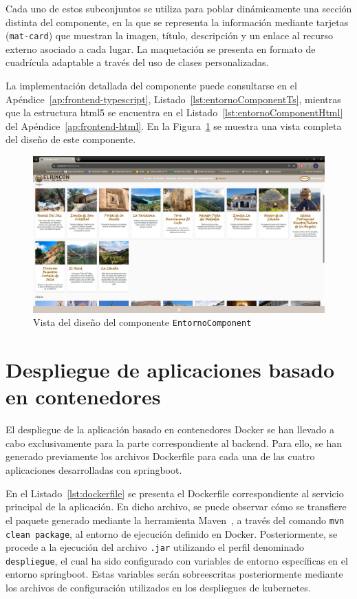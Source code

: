Cada uno de estos subconjuntos se utiliza para poblar dinámicamente una sección distinta del componente, en la que se representa la información mediante tarjetas (\texttt{mat-card}) que muestran la imagen, título, descripción y un enlace al recurso externo asociado a cada lugar. La maquetación se presenta en formato de cuadrícula adaptable a través del uso de clases personalizadas.

La implementación detallada del componente puede consultarse en el Apéndice~\ref{ap:frontend-typescript}, Listado~\ref{lst:entornoComponentTs}, mientras que la estructura \gls{html5} se encuentra en el Listado~\ref{lst:entornoComponentHtml} del Apéndice~\ref{ap:frontend-html}.
En la Figura~\ref{fig:entorno-component} se muestra una vista completa del diseño de este componente.
\begin{figure}
    \centering
        \includegraphics[width=1\textwidth]{figs/entorno.png}
        \caption{Vista del diseño del componente \texttt{EntornoComponent}}
        \label{fig:entorno-component}
\end{figure}
\section{Despliegue de aplicaciones basado en contenedores}
El despliegue de la aplicación basado en contenedores Docker se han llevado a cabo exclusivamente para la parte correspondiente al \gls{backend}. Para ello, se han generado previamente los archivos Dockerfile para cada una de las cuatro aplicaciones desarrolladas con \gls{springboot}.

En el Listado~\ref{lst:dockerfile} se presenta el Dockerfile correspondiente al servicio principal de la aplicación. En dicho archivo, se puede observar cómo se transfiere el paquete generado mediante la herramienta Maven~\cite{maven:web}, a través del comando \texttt{mvn clean package}, al entorno de ejecución definido en Docker. Posteriormente, se procede a la ejecución del archivo \texttt{.jar} utilizando el perfil denominado \texttt{despliegue}, el cual ha sido configurado con variables de entorno específicas en el entorno \gls{springboot}. Estas variables serán sobreescritas posteriormente mediante los archivos de configuración utilizados en los despliegues de \gls{kubernetes}.


